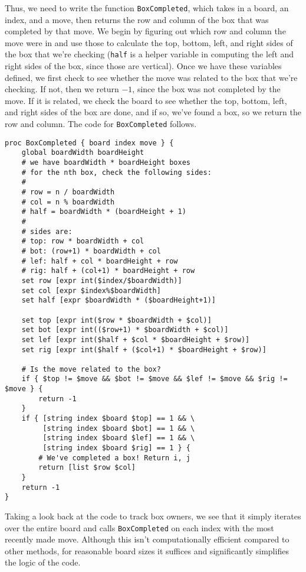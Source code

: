 \documentclass{article}
\begin{document}
Thus, we need to write the function \texttt{BoxCompleted}, which takes in a board, an index, and a move, then returns the row and column of the box that was completed by that move. We begin by figuring out which row and column the move were in and use those to calculate the top, bottom, left, and right sides of the box that we're checking (\texttt{half} is a helper variable in computing the left and right sides of the box, since those are vertical). Once we have these variables defined, we first check to see whether the move was related to the box that we're checking. If not, then we return $-1$, since the box was not completed by the move. If it is related, we check the board to see whether the top, bottom, left, and right sides of the box are done, and if so, we've found a box, so we return the row and column. The code for \texttt{BoxCompleted} follows.

\begin{verbatim}
proc BoxCompleted { board index move } {
    global boardWidth boardHeight
    # we have boardWidth * boardHeight boxes
    # for the nth box, check the following sides:
    #
    # row = n / boardWidth
    # col = n % boardWidth
    # half = boardWidth * (boardHeight + 1)
    #
    # sides are:
    # top: row * boardWidth + col
    # bot: (row+1) * boardWidth + col
    # lef: half + col * boardHeight + row
    # rig: half + (col+1) * boardHeight + row
    set row [expr int($index/$boardWidth)]
    set col [expr $index%$boardWidth]
    set half [expr $boardWidth * ($boardHeight+1)]

    set top [expr int($row * $boardWidth + $col)]
    set bot [expr int(($row+1) * $boardWidth + $col)]
    set lef [expr int($half + $col * $boardHeight + $row)]
    set rig [expr int($half + ($col+1) * $boardHeight + $row)]

    # Is the move related to the box?
    if { $top != $move && $bot != $move && $lef != $move && $rig != $move } {
        return -1
    }
    if { [string index $board $top] == 1 && \
         [string index $board $bot] == 1 && \
         [string index $board $lef] == 1 && \
         [string index $board $rig] == 1 } {
        # We've completed a box! Return i, j
        return [list $row $col]
    }
    return -1
}
\end{verbatim}

Taking a look back at the code to track box owners, we see that it simply iterates over the entire board and calls \texttt{BoxCompleted} on each index with the most recently made move. Although this isn't computationally efficient compared to other methods, for reasonable board sizes it suffices and significantly simplifies the logic of the code.
\end{document}
